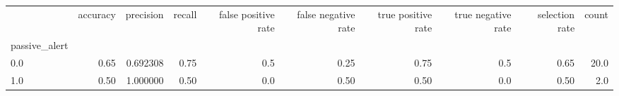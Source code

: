 \begin{tabular}{lrrrrrrrrr}
\toprule
{} &  accuracy &  precision &  recall &  false positive rate &  false negative rate &  true positive rate &  true negative rate &  selection rate &  count \\
passive\_alert &           &            &         &                      &                      &                     &                     &                 &        \\
\midrule
0.0           &      0.65 &   0.692308 &    0.75 &                  0.5 &                 0.25 &                0.75 &                 0.5 &            0.65 &   20.0 \\
1.0           &      0.50 &   1.000000 &    0.50 &                  0.0 &                 0.50 &                0.50 &                 0.0 &            0.50 &    2.0 \\
\bottomrule
\end{tabular}
